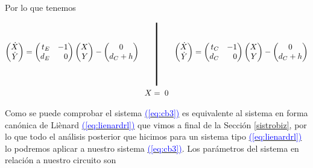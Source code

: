 \documentclass[12pt,a4paper]{report} %
\newcommand{\eref}[1]{\hyperref[#1]{\textcolor{blue}{(\ref*{#1})}}}
\newcommand{\eref}[1]{\hyperref[#1]{\textcolor{blue}{\textit{(\ref*{#1})}}}}
\begin{document}
	\vspace{0.5cm}\noindent Por lo que tenemos
	
	\begin{equation}
		\label{eq:cb3}
		\begin{gathered}
			\begin{pmatrix*}[r]
				\dot{X}\\ \dot{Y}
			\end{pmatrix*}= \begin{pmatrix*}[r]
				t_E & -1 \\ d_E & 0
			\end{pmatrix*} \begin{pmatrix*}[r]
				X \\ Y
			\end{pmatrix*}-\begin{pmatrix*}[c]
				0 \\ d_C+h
			\end{pmatrix*} \qquad 
			\rule[-40pt]{1.5pt}{80pt} \qquad 
				\begin{pmatrix*}[r]
				\dot{X}\\ \dot{Y}
			\end{pmatrix*}= \begin{pmatrix*}[r]
				t_C & -1 \\ d_C & 0
			\end{pmatrix*} \begin{pmatrix*}[r]
				X \\ Y
			\end{pmatrix*}-\begin{pmatrix*}[c]
				0 \\ d_C+h
			\end{pmatrix*} \\ X=\;0
		\end{gathered}
	\end{equation}\smallskip
	
	\newpage
	
	\vspace{0.5cm} \noindent Como se puede comprobar el sistema \eref{eq:cb3} es equivalente al sistema en forma canónica de Liènard \eref{eq:lienardrl} que vimos a final de la Sección \ref{sistrobiz}, por lo que todo el análisis posterior que hicimos para un sistema tipo \eref{eq:lienardrl} lo podremos aplicar a nuestro sistema \eref{eq:cb3}. Los parámetros del sistema en relación a nuestro circuito son
	
\end{document}
